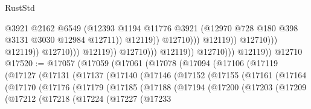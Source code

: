 \begin{lexlean}{RustStd}
\begin{coremodule}
                                                          @3921
                                                          @2162
                                                          @6549
                                                          (@12393
                                                            @1194
                                                            @11776
                                                            @3921
                                                            (@12970
                                                              @728
                                                              @180
                                                              @398
                                                              @3131
                                                              @3030
                                                              @12984
                                                              @12711))
                                                          @12119))
                                                      @12710)))
                                                @12119))
                                            @12710)))
                                      @12119))
                                  @12710)))
                            @12119))
                        @12710)))
                  @12119))
              @12710)))
        @12119))
    @12710
@17520 := @17057
    (@17059
      (@17061
        (@17078
          (@17094
            (@17106
              (@17119
                (@17127
                  (@17131
                    (@17137
                      (@17140
                        (@17146
                          (@17152
                            (@17155
                              (@17161
                                (@17164
                                  (@17170
                                    (@17176
                                      (@17179
                                        (@17185
                                          (@17188
                                            (@17194
                                              (@17200
                                                (@17203
                                                  (@17209
                                                    (@17212
                                                      (@17218
                                                        (@17224
                                                          (@17227
                                                            (@17233

\end{coremodule}
\end{lexlean}

